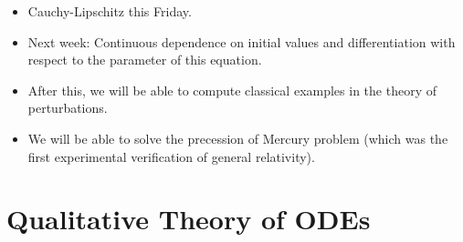 \documentclass[../notes.tex]{subfiles}
\begin{document}
\begin{itemize}
    \item Cauchy-Lipschitz this Friday.
    \item Next week: Continuous dependence on initial values and differentiation with respect to the parameter of this equation.
    \item After this, we will be able to compute classical examples in the theory of perturbations.
    \item We will be able to solve the precession of Mercury problem (which was the first experimental verification of general relativity).
\end{itemize}



\section{Qualitative Theory of ODEs}
\end{document}
